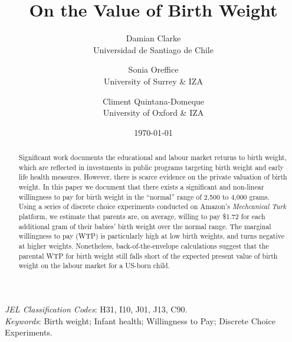 \documentclass[a4paper, 11pt]{article}
\title{On the Value of Birth Weight}
\author{\small{Damian Clarke} \\ \small{Universidad de Santiago de Chile} \and \small{Sonia Oreffice} \\ \small{University of Surrey \& IZA}  \and \small{Climent Quintana-Domeque} \\ \small{University of Oxford \& IZA}}
\date{\today}
\begin{document}
\begin{spacing}{1.4}
\maketitle

\begin{abstract}
  Significant work documents the educational and labour market returns
  to birth weight, which are reflected in investments in public
  programs targeting birth weight and early life health measures.  However,
  there is scarce evidence on the private valuation of birth
  weight. In this paper we document that there exists a significant and non-linear
  willingness to pay for birth weight in the ``normal'' range of
  2,500 to 4,000 grams.  Using a series of discrete choice experiments conducted
  on Amazon's \emph{Mechcanical Turk} platform, we
  estimate that parents are, on average, willing to pay \$1.72 for each
  additional gram of their babies' birth weight over the normal range.  The
  marginal willingness to pay (WTP) is particularly high at low birth weights,
  and turns negative at higher weights.  Nonetheless, back-of-the-envelope
  calculations suggest that the parental WTP for birth weight still falls short
  of the expected present value of birth weight on the labour market for a
  US-born child.
\end{abstract}
\emph{JEL Classification Codes}: H31, I10, J01, J13, C90.\\
\emph{Keywords}: Birth weight; Infant health; Willingness to Pay; Discrete
Choice Experiments.

\newpage

\end{spacing}
\end{document}
